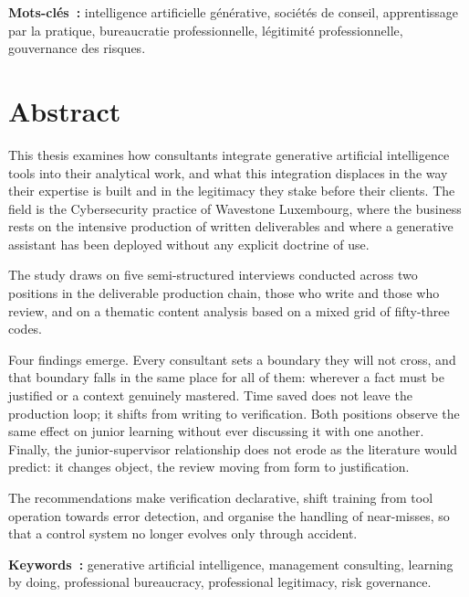\documentclass{tnreport}
\begin{document}
\vspace{1cm}
{\bf Mots-clés~:} intelligence artificielle générative, sociétés de conseil, apprentissage
par la pratique, bureaucratie professionnelle, légitimité professionnelle, gouvernance des
risques.


\section*{Abstract}

This thesis examines how consultants integrate generative artificial intelligence tools
into their analytical work, and what this integration displaces in the way their expertise
is built and in the legitimacy they stake before their clients. The field is the
Cybersecurity practice of Wavestone Luxembourg, where the business rests on the intensive
production of written deliverables and where a generative assistant has been deployed
without any explicit doctrine of use.
 
The study draws on five semi-structured interviews conducted across two positions in the
deliverable production chain, those who write and those who review, and on a thematic content analysis based on a mixed grid of fifty-three codes.
 
Four findings emerge. Every consultant sets a boundary they will not cross, and that
boundary falls in the same place for all of them: wherever a fact must be justified or a
context genuinely mastered. Time saved does not leave the production loop; it shifts from
writing to verification. Both positions observe the same effect on junior learning without
ever discussing it with one another. Finally, the junior-supervisor relationship does not
erode as the literature would predict: it changes object, the review moving from form to
justification.
 
The recommendations make verification declarative, shift training from tool operation
towards error detection, and organise the handling of near-misses, so that a control system
no longer evolves only through accident.

\vspace{1cm}
{\bf Keywords~:} generative artificial intelligence, management consulting, learning by
doing, professional bureaucracy, professional legitimacy, risk governance.
\end{document}
